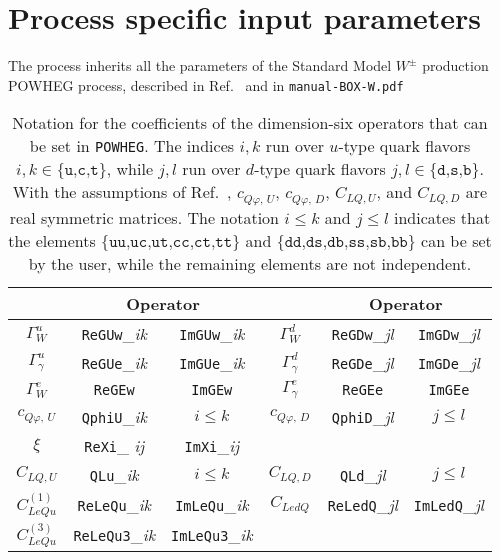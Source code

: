 \documentclass[paper]{JHEP3}
\newcommand\POWHEG{{\tt POWHEG}}
\begin{document}
\section{Process specific input parameters}

The process inherits all the parameters of the Standard Model $W^\pm$ production POWHEG process,
described in Ref.\ \cite{Alioli:2008gx} and in \texttt{manual-BOX-W.pdf}


\begin{table}
\center
\begin{small}
\begin{tabular}{||c|cc||c|cc||}
\hline
								  &  \multicolumn{2}{|c||}{Operator} 	 					&
								  &  \multicolumn{2}{c||}{Operator} 												 \\
\hline
$\Gamma^u_W$ 		& \texttt{ReGUw}\_\textit{ik} & \texttt{ImGUw}\_\textit{ik}  				  		&
$\Gamma^d_W$ 		& \texttt{ReGDw}\_\textit{jl} & \texttt{ImGDw}\_\textit{jl} 				 		\\%
 $\Gamma^u_\gamma$   	& \texttt{ReGUe}\_\textit{ik} & \texttt{ImGUe}\_\textit{ik} 				  		& 
 $\Gamma^d_\gamma$   	& \texttt{ReGDe}\_\textit{jl}	& \texttt{ImGDe}\_\textit{jl}   		\\
$\Gamma^e_W$ 		& \texttt{ReGEw} & \texttt{ImGEw} 		         & 
$\Gamma^e_\gamma$ 	& \texttt{ReGEe} & \texttt{ImGEe} 					\\
\hline
$c^{}_{Q\varphi,\, U}$ 	& \texttt{QphiU}\_\textit{ik}				&   $i \le k$ 	& 
$c^{}_{Q\varphi,\, D}$ 	& \texttt{QphiD}\_\textit{jl} 				&   $j \le l$  	\\
$\xi$          		&  \texttt{ReXi}\_{\textit{ ij}} & \texttt{ImXi}\_\textit{ij}  & & 	&\\ 
\hline
$C_{LQ,U}$ 		&  \texttt{QLu}\_\textit{ik} 				&   $i\le k$ 	&  
$C_{LQ,D}$ 		&  \texttt{QLd}\_\textit{jl}				&   $j\le l$ 	\\
$C^{(1)}_{LeQu}$ 	& \texttt{ReLeQu}\_\textit{ik} 				&   \texttt{ImLeQu}\_\textit{ik}  & 
$C_{LedQ}$  		& \texttt{ReLedQ}\_\textit{jl} 				&  \texttt{ImLedQ}\_\textit{jl}	\\
$C^{(3)}_{LeQu}$   	&  \texttt{ReLeQu3}\_\textit{ik}  	& \texttt{ImLeQu3}\_\textit{ik}		       	&  \\
\hline
\end{tabular}
\end{small}
\caption{Notation for the coefficients of the dimension-six operators that can be set in \POWHEG{}.
The indices $i, k$ run over $u$-type quark flavors $\textit{i},\textit{k} \in \{\texttt{u,c,t}\}$, while $j, l$ run over $d$-type quark flavors $\textit{j},\textit{l} \in \{\texttt{d,s,b}\}$.
With the assumptions of Ref.\ \cite{Alioli:2018ljm}, $c^{}_{Q\varphi,\, U}$, $c^{}_{Q\varphi,\, D}$, 
$C_{LQ,U}$, and $C_{LQ,D}$ are real symmetric matrices. The notation $i \le k$ and $j \le l$ indicates that the elements $\{\texttt{uu,uc,ut,cc,ct,tt}\}$ 
and $\{\texttt{dd,ds,db,ss,sb,bb}\}$ can be set by the user, while the remaining elements are not independent. }\label{TabA}
\end{table}
\end{document}
